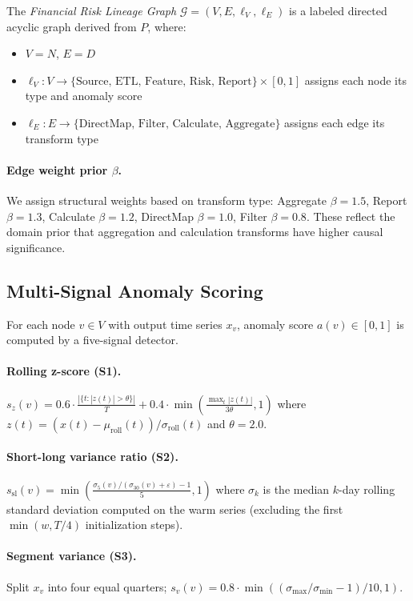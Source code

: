 \documentclass{article}
\begin{document}
The \emph{Financial Risk Lineage Graph} $\mathcal{G} = (V, E, \ell_V, \ell_E)$
is a labeled directed acyclic graph derived from $P$, where:
\begin{itemize}
  \item $V = N$, $E = D$
  \item $\ell_V : V \to \{\text{Source, ETL, Feature, Risk, Report}\} \times [0,1]$
        assigns each node its type and anomaly score
  \item $\ell_E : E \to \{\text{DirectMap, Filter, Calculate, Aggregate}\}$
        assigns each edge its transform type
\end{itemize}

\paragraph{Edge weight prior $\beta$.}
We assign structural weights based on transform type: Aggregate $\beta = 1.5$,
Report $\beta = 1.3$, Calculate $\beta = 1.2$, DirectMap $\beta = 1.0$,
Filter $\beta = 0.8$.
These reflect the domain prior that aggregation and calculation transforms
have higher causal significance.

\subsection{Multi-Signal Anomaly Scoring}

For each node $v \in V$ with output time series $x_v$, anomaly score
$a(v) \in [0,1]$ is computed by a five-signal detector.

\paragraph{Rolling z-score (S1).}
$s_z(v) = 0.6 \cdot \frac{|\{t : |z(t)| > \theta\}|}{T} + 0.4 \cdot \min\!\left(\frac{\max_t|z(t)|}{3\theta}, 1\right)$
where $z(t) = (x(t) - \mu_{\text{roll}}(t)) / \sigma_{\text{roll}}(t)$ and
$\theta = 2.0$.

\paragraph{Short-long variance ratio (S2).}
$s_{\text{sl}}(v) = \min\!\left(\frac{\sigma_5(v) / (\sigma_{30}(v) + \varepsilon) - 1}{5}, 1\right)$
where $\sigma_k$ is the median $k$-day rolling standard deviation computed on
the warm series (excluding the first $\min(w, T/4)$ initialization steps).

\paragraph{Segment variance (S3).}
Split $x_v$ into four equal quarters; $s_v(v) = 0.8 \cdot \min((\sigma_{\max}/\sigma_{\min}-1)/10, 1)$.
\end{document}
